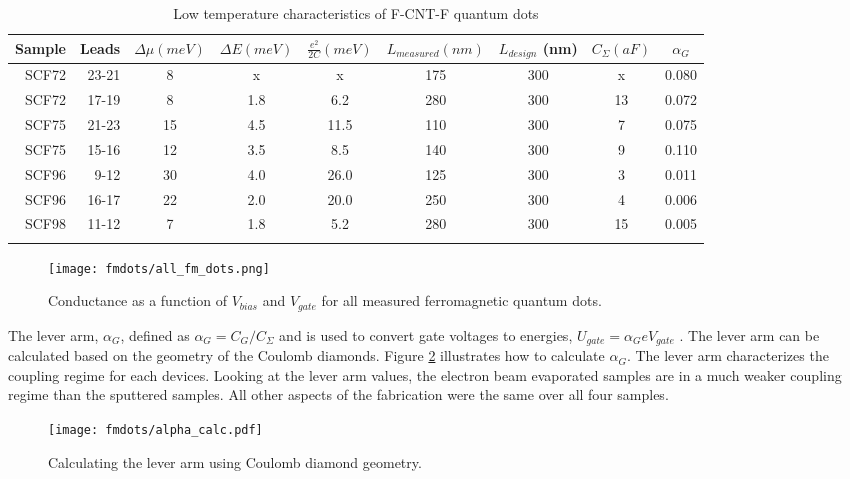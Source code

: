 \begin{table}
    \centering
    \footnotesize
    \begin{tabular}{ r | r | c c c c c c c}
        Sample & Leads & $\Delta \mu (meV)$ & $\Delta E (meV)$ & $\frac{e^2}{2C} (meV)$ & $L_{measured} (nm)$ & $L_{design}$ (nm) & $C_{\Sigma} (aF)$ & $\alpha_{G}$ \\ \hline
        SCF72 & 23-21 & 8  & x   & x    & 175 & 300 & x  & 0.080 \\ 
        SCF72 & 17-19 & 8  & 1.8 & 6.2  & 280 & 300 & 13 & 0.072 \\
        SCF75 & 21-23 & 15 & 4.5 & 11.5 & 110 & 300 & 7  & 0.075 \\
        SCF75 & 15-16 & 12 & 3.5 & 8.5  & 140 & 300 & 9  & 0.110 \\
        SCF96 & 9-12  & 30 & 4.0 & 26.0 & 125 & 300 & 3  & 0.011 \\
        SCF96 & 16-17 & 22 & 2.0 & 20.0 & 250 & 300 & 4  & 0.006 \\
        SCF98 & 11-12 & 7  & 1.8 & 5.2  & 280 & 300 & 15 & 0.005 \\
        \label{table:cold_fm_devices}  
    \end{tabular}
    \caption{Low temperature characteristics of F-CNT-F quantum dots}
\end{table}

\begin{figure}
    \centering
    \texttt{[image: fmdots/all\_fm\_dots.png]}
    \caption{Conductance as a function of $V_{bias}$ and $V_{gate}$ for all measured ferromagnetic quantum dots.}
    \label{fig:all_FM_QD}
\end{figure}

The lever arm, $\alpha_{G}$, defined as $\alpha_{G} = C_G/C_{\Sigma}$ and is used to convert gate voltages to energies, $U_{gate} = \alpha_{G}eV_{gate}$ \cite{Ihn2004}. The lever arm can be calculated based on the geometry of the Coulomb diamonds. Figure \ref{fig:alpha_calc} illustrates how to calculate $\alpha_{G}$. The lever arm characterizes the coupling regime for each devices. Looking at the lever arm values, the electron beam evaporated samples are in a much weaker coupling regime than the sputtered samples. All other aspects of the fabrication were the same over all four samples. 

\begin{figure}
    \centering
    \texttt{[image: fmdots/alpha\_calc.pdf]}
    \caption{Calculating the lever arm using Coulomb diamond geometry.}
    \label{fig:alpha_calc}
\end{figure}

